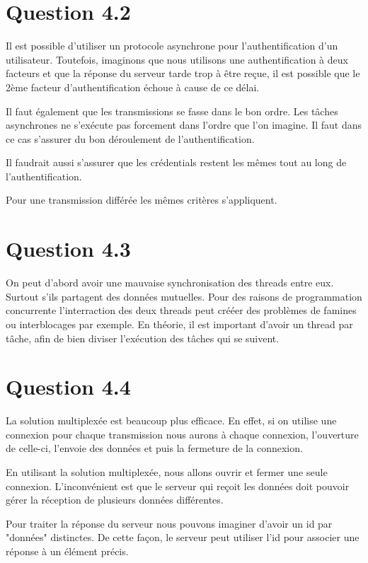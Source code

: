 \documentclass[12pt]{article}
\begin{document}
\section*{Question 4.2}

Il est possible d'utiliser un protocole asynchrone pour l'authentification d'un utilisateur.
Toutefois, imaginons que nous utilisons une authentification à deux facteurs et que la réponse du serveur tarde trop à être reçue, il est possible que le 2ème facteur d'authentification échoue à cause de ce délai.

Il faut également que les transmissions se fasse dans le bon ordre. Les tâches asynchrones ne s'exécute pas forcement dans l'ordre que l'on imagine. Il faut dans ce cas s'assurer du bon déroulement de l'authentification.

Il faudrait aussi s'assurer que les crédentials restent les mêmes tout au long de l'authentification.

Pour une transmission différée les mêmes critères s'appliquent.


\section*{Question 4.3}
On peut d'abord avoir une mauvaise synchronisation des threads entre eux. Surtout s'ils partagent des données mutuelles. Pour des raisons de programmation concurrente l'interraction des deux threads peut crééer des problèmes de famines ou interblocages par exemple.
En théorie, il est important d'avoir un thread par tâche, afin de bien diviser l'exécution des tâches qui se suivent.

\section*{Question 4.4}

La solution multiplexée est beaucoup plus efficace. En effet, si on utilise une connexion pour chaque transmission nous aurons à chaque connexion, l'ouverture de celle-ci, l'envoie des données et puis la fermeture de la connexion. 

En utilisant la solution multiplexée, nous allons ouvrir et fermer une seule connexion.
L'inconvénient est que le serveur qui reçoit les données doit pouvoir gérer la réception de plusieurs données différentes.

Pour traiter la réponse du serveur nous pouvons imaginer d'avoir un id par "données" distinctes. De cette façon, le serveur peut utiliser l'id pour associer une réponse à un élément précis.
\end{document}
